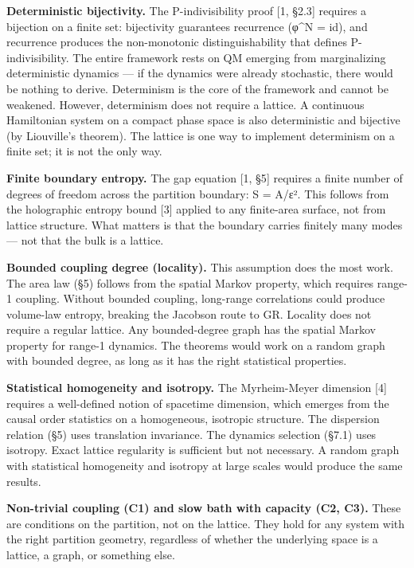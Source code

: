 \documentclass[
  11pt,
]{article}
\begin{document}
\textbf{Deterministic bijectivity.} The P-indivisibility proof {[}1,
§2.3{]} requires a bijection on a finite set: bijectivity guarantees
recurrence (φ\^{}N = id), and recurrence produces the non-monotonic
distinguishability that defines P-indivisibility. The entire framework
rests on QM emerging from marginalizing deterministic dynamics --- if
the dynamics were already stochastic, there would be nothing to derive.
Determinism is the core of the framework and cannot be weakened.
However, determinism does not require a lattice. A continuous
Hamiltonian system on a compact phase space is also deterministic and
bijective (by Liouville's theorem). The lattice is one way to implement
determinism on a finite set; it is not the only way.

\textbf{Finite boundary entropy.} The gap equation {[}1, §5{]} requires
a finite number of degrees of freedom across the partition boundary: S =
A/ε². This follows from the holographic entropy bound {[}3{]} applied to
any finite-area surface, not from lattice structure. What matters is
that the boundary carries finitely many modes --- not that the bulk is a
lattice.

\textbf{Bounded coupling degree (locality).} This assumption does the
most work. The area law (§5) follows from the spatial Markov property,
which requires range-1 coupling. Without bounded coupling, long-range
correlations could produce volume-law entropy, breaking the Jacobson
route to GR. Locality does not require a regular lattice. Any
bounded-degree graph has the spatial Markov property for range-1
dynamics. The theorems would work on a random graph with bounded degree,
as long as it has the right statistical properties.

\textbf{Statistical homogeneity and isotropy.} The Myrheim-Meyer
dimension {[}4{]} requires a well-defined notion of spacetime dimension,
which emerges from the causal order statistics on a homogeneous,
isotropic structure. The dispersion relation (§5) uses translation
invariance. The dynamics selection (§7.1) uses isotropy. Exact lattice
regularity is sufficient but not necessary. A random graph with
statistical homogeneity and isotropy at large scales would produce the
same results.

\textbf{Non-trivial coupling (C1) and slow bath with capacity (C2, C3).}
These are conditions on the partition, not on the lattice. They hold for
any system with the right partition geometry, regardless of whether the
underlying space is a lattice, a graph, or something else.
\end{document}

